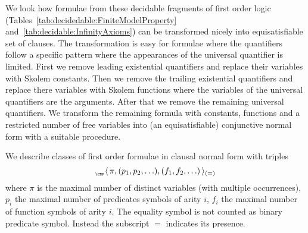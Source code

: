 


We look how formulae from these decidable fragments of first order logic
(Tables~\ref{tab:decidedable:FiniteModelProperty} and~\ref{tab:decidable:InfinityAxioms})
can be transformed nicely into equisatisfiable set of clauses.
The transformation is easy for formulae where the quantifiers follow a specific pattern where the appearances of the universal quantifier is limited. First we remove leading existential quantifiers and replace their variables with Skolem constants.
Then we remove the trailing existential quantifiers and replace there variables with Skolem functions where the variables of the universal quantifiers are the arguments. After that we remove the remaining universal quantifiers. We transform the remaining formula with constants, functions and a restricted number of free variables into (an equisatisfiable) conjunctive normal form with a suitable procedure.

\begin{definition}\label{def:prefix:class}
	We describe classes of first order formulae in clausal normal form with triples
	\[
	_{_\CNF}\langle\, \pi, (p_1,p_2,\ldots), (f_1,f_2,\ldots)\,\rangle_{(=)}
	\]
	where \( \pi \) is the maximal number of distinct variables (with multiple occurrences),
	\( p_i \) the maximal number of predicates symbols of arity \( i \),
	\( f_i \) the maximal number of function symbols of arity \( i \).
	The equality symbol is not counted as binary predicate symbol.
	Instead the subscript \( = \) indicates its presence.
\end{definition}

